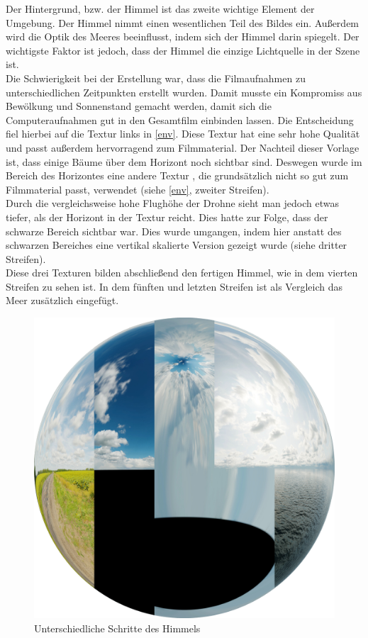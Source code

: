 Der Hintergrund, bzw. der Himmel ist das zweite wichtige Element der Umgebung. Der Himmel nimmt einen wesentlichen Teil des Bildes ein. Außerdem wird die Optik des Meeres beeinflusst, indem sich der Himmel darin spiegelt. Der wichtigste Faktor ist jedoch, dass der Himmel die einzige Lichtquelle in der Szene ist.\\
Die Schwierigkeit bei der Erstellung war, dass die Filmaufnahmen zu unterschiedlichen Zeitpunkten erstellt wurden. Damit musste ein Kompromiss aus Bewölkung und Sonnenstand gemacht werden, damit sich die Computeraufnahmen gut in den Gesamtfilm einbinden lassen. Die Entscheidung fiel hierbei auf die Textur links in \autoref{env}. Diese Textur hat eine sehr hohe Qualität und passt außerdem hervorragend zum Filmmaterial. Der Nachteil dieser Vorlage ist, dass einige Bäume über dem Horizont noch sichtbar sind. Deswegen wurde im Bereich des Horizontes eine andere Textur , die grundsätzlich nicht so gut zum Filmmaterial passt, verwendet (siehe \autoref{env}, zweiter Streifen).\\
Durch die vergleichsweise hohe Flughöhe der Drohne sieht man jedoch etwas tiefer, als der Horizont in der Textur reicht. Dies hatte zur Folge, dass der schwarze Bereich sichtbar war. Dies wurde umgangen, indem hier anstatt des schwarzen Bereiches eine vertikal skalierte Version gezeigt wurde (siehe dritter Streifen).\\
Diese drei Texturen bilden abschließend den fertigen Himmel, wie in dem vierten Streifen zu sehen ist. In dem fünften und letzten Streifen ist als Vergleich das Meer zusätzlich eingefügt.

\begin{figure}[H]
\includegraphics[width=\textwidth]{gfx/prod/env/env.jpg}
\caption{Unterschiedliche Schritte des Himmels}
\label{env}
\end{figure}
%
